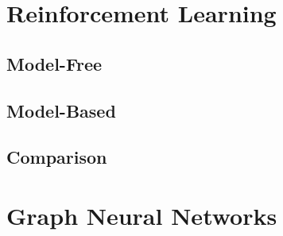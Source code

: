 \section{Reinforcement Learning}
\subsection{Model-Free}
\subsection{Model-Based}
\subsection{Comparison}

\section{Graph Neural Networks}